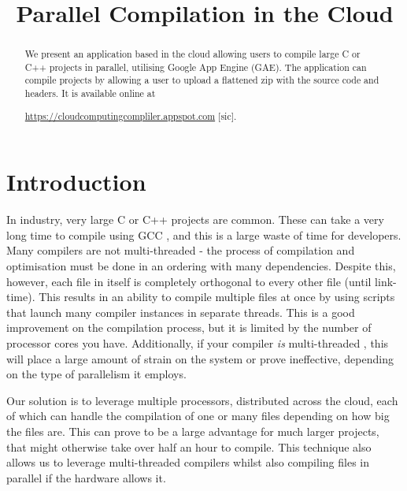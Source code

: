 \documentclass[conference]{IEEEtran}
\begin{document}
\title{Parallel Compilation in the Cloud}

\author{
\and
{}
}

\maketitle

\begin{abstract}
We present an application based in the cloud allowing users to compile large C
or C++ projects in parallel, utilising Google App Engine (GAE). The application
can compile projects by allowing a user to upload a flattened zip with the
source code and headers. It is available online at

\noindent\url{https://cloudcomputingcompliler.appspot.com} [sic].

\end{abstract}
\section{Introduction}
In industry, very large C or C++ projects are common. These can take a very
long time to compile using GCC \cite{GCC}, and this is a
large waste of time for developers. Many compilers are not multi-threaded - the
process of compilation and optimisation must be done in an ordering
with many dependencies. Despite this, however, each file in itself is completely
orthogonal to every other file (until link-time). This results in an ability to
compile multiple files at once by using scripts that launch many compiler
instances in separate threads. This is a good improvement on the compilation
process, but it is limited by the number of processor cores you have.
Additionally, if your compiler \emph{is} multi-threaded \cite{rust}, this will
place a large amount of strain on the system or prove ineffective, depending on
the type of parallelism it employs.

Our solution is to leverage multiple processors, distributed across the cloud,
each of which can handle the compilation of one or many files depending on how
big the files are. This can prove to be a large advantage for much larger
projects, that might otherwise take over half an hour to compile. This technique
also allows us to leverage multi-threaded compilers whilst also compiling files
in parallel if the hardware allows it.
\end{document}
